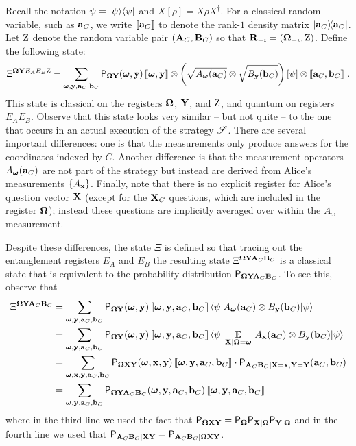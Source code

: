 Recall the notation $\psi = \ket{\psi}\bra{\psi}$ and $X[\rho]=X\rho X^\dagger$. For a classical random variable, such as $\ba_C$, we write $\puretomixed{\ba_C}$ to denote the rank-$1$ density matrix $\ketbra{\ba_C}{\ba_C}$. Let $\ac$ denote the random variable pair $(\bA_C, \bB_C)$ so that $\bR_\mi = (\bOmega_\mi,\ac)$. Define the following state:
\[
\Xi^{\bOmega \bY E_AE_B\ac} = \sum_{\bomega, \by, \ba_C, \bb_C} \P_{\bOmega \bY} (\bomega, \by) \, \puretomixed{\bomega, \by}   \otimes \left (\sqrt{A_{\bomega}(\ba_C)} \otimes \sqrt{B_{\by}(\bb_C)} \right ) \left [\psi \right ] \otimes \puretomixed{\ba_C, \bb_C}~.
\]
This state is classical on the registers $\bOmega$, $\bY$, and $\ac$, and quantum on registers $E_A E_B$. Observe that this state looks very similar -- but not quite -- to the one that occurs in an actual execution of the strategy $\strategy$. There are several important differences: one is that the measurements only produce answers for the coordinates indexed by $C$. Another difference is that the measurement operators $A_\bomega(\ba_C)$ are not part of the strategy but instead are derived from Alice's measurements $\{A_\bx\}$. Finally, note that there is no explicit register for Alice's question vector $\bX$ (except for the $\bX_C$ questions, which are included in the register $\bOmega$); instead these questions are implicitly averaged over within the $A_\omega$ measurement. 

Despite these differences, the state $\Xi$ is defined so that tracing out the entanglement registers $E_A$ and $E_B$ the resulting state $\Xi^{\bOmega \bY \bA_C \bB_C}$ is a classical state that is equivalent to the probability distribution $\P_{\bOmega \bY \bA_C \bB_C}$. To see this, observe that
\begin{align*}
\Xi^{\bOmega \bY \bA_C \bB_C} &= \sum_{\bomega, \by, \ba_C, \bb_C} \P_{\bOmega \bY}(\bomega, \by) \, \puretomixed{\bomega, \by, \ba_C, \bb_C} \, \bra{\psi} A_\bomega(\ba_C) \otimes B_\by(\bb_C) \ket{\psi} \\
&= \sum_{\bomega, \by, \ba_C, \bb_C} \P_{\bOmega \bY}(\bomega, \by) \, \puretomixed{\bomega, \by, \ba_C, \bb_C} \, \bra{\psi} \Ex_{\bX | \bOmega = \bomega} \, A_\bx(\ba_C)  \otimes B_\by(\bb_C) \ket{\psi} \\
&= \sum_{\bomega, \bx, \by, \ba_C, \bb_C} \P_{\bOmega \bX \bY}(\bomega, \bx, \by) \, \puretomixed{\bomega, \by, \ba_C, \bb_C} \cdot \P_{\bA_C \bB_C | \bX = \bx, \bY = \bY}(\ba_C,\bb_C) \\
&= \sum_{\bomega,\by, \ba_C, \bb_C} \P_{\bOmega\bY \bA_C \bB_C}(\bomega, \by, \ba_C,\bb_C) \, \puretomixed{\bomega, \by, \ba_C, \bb_C}
\end{align*}
where in the third line we used the fact that $\P_{\bOmega \bX \bY} = \P_{\bOmega} \P_{\bX | \bOmega} \P_{\bY | \bOmega}$ and in the fourth line we used that $\P_{\bA_C \bB_C | \bX \bY} = \P_{\bA_C \bB_C | \bOmega \bX \bY}$. 

